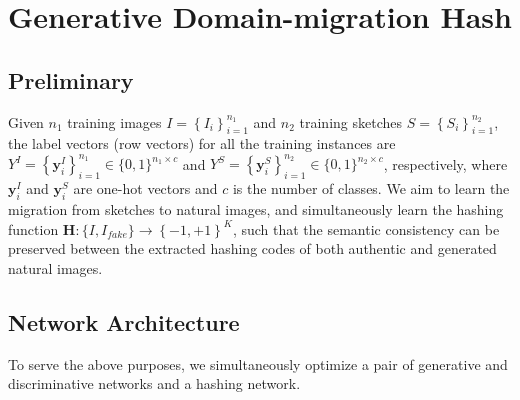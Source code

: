 \documentclass[runningheads]{llncs}
\begin{document}
\section{Generative Domain-migration Hash}
\subsection{Preliminary}
Given $n_1$ training images $I= \left \{ I_i \right \}^{n_1}_{i=1}$ and $n_2$ training sketches $S= \left \{ S_i \right \}^{n_2}_{i=1}$, the label vectors (row vectors) for all the training instances are $Y^I = \left \{ \mathbf{y}^I_i \right \}^{n_1}_{i=1}\in \{0, 1\}^{n_1\times c}$ and $Y^S = \left \{ \mathbf{y}^S_i \right \}^{n_2}_{i=1}\in \{0,1\}^{n_2\times c}$, respectively, where $\mathbf{y}^I_i$ and $\mathbf{y}^S_i$ are one-hot vectors and $c$ is the number of classes.
We aim to learn the migration from sketches to natural images, and simultaneously learn the hashing function $\mathbf{H} : \{I, I_{fake} \} \rightarrow \left \{ -1,+1 \right \}^K$, such that the semantic consistency can be preserved between the extracted hashing codes of both authentic and generated natural images.

%



\subsection{Network Architecture}
To serve the above purposes, we simultaneously optimize a pair of generative and discriminative networks and a hashing network.
 
\end{document}
